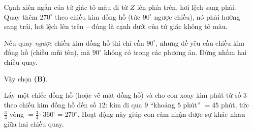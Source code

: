 {
Cạnh xiên ngắn của tứ giác tô màu đi từ $Z$ lên phía trên, hơi lệch sang phải. Quay thêm $270^\circ$ theo chiều kim đồng hồ (tức $90^\circ$ ngược chiều), nó phải hướng sang trái, hơi lệch lên trên -- đúng là cạnh dưới của tứ giác không tô màu.
\begin{warnbox}Nếu quay \emph{ngược} chiều kim đồng hồ thì chỉ cần $90^\circ$, nhưng đề yêu cầu chiều kim đồng hồ (chiều mũi tên), mà $90^\circ$ không có trong các phương án. Đừng nhầm hai chiều quay.\end{warnbox}
Vậy chọn \textbf{(B)}.
\begin{parentbox}Lấy một chiếc đồng hồ (hoặc vẽ mặt đồng hồ) và cho con xoay kim phút từ số $3$ theo chiều kim đồng hồ đến số $12$: kim đi qua $9$ ``khoảng $5$ phút'' $=45$ phút, tức $\frac34$ vòng $=\frac34\cdot360^\circ=270^\circ$. Hoạt động này giúp con cảm nhận được sự khác nhau giữa hai chiều quay.\end{parentbox}
}

